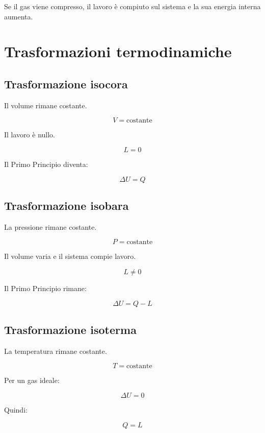 \noindent Se il gas viene compresso, il lavoro è compiuto sul sistema e la sua energia interna aumenta.

\vspace{0.3cm}

\section{Trasformazioni termodinamiche}

\subsection{Trasformazione isocora}

\noindent Il volume rimane costante.

\[
V=\text{costante}
\]

\noindent Il lavoro è nullo.

\[
L=0
\]

\noindent Il Primo Principio diventa:

\[
\Delta U=Q
\]

\vspace{0.3cm}

\subsection{Trasformazione isobara}

\noindent La pressione rimane costante.

\[
P=\text{costante}
\]

\noindent Il volume varia e il sistema compie lavoro.

\[
L\neq0
\]

\noindent Il Primo Principio rimane:

\[
\Delta U=Q-L
\]

\vspace{0.3cm}

\subsection{Trasformazione isoterma}

\noindent La temperatura rimane costante.

\[
T=\text{costante}
\]

\noindent Per un gas ideale:

\[
\Delta U=0
\]

\noindent Quindi:

\[
Q=L
\]

